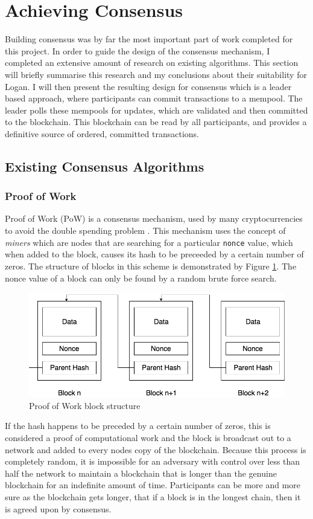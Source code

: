 \documentclass[12pt,a4paper,twoside,openright]{report}
\begin{document}
	\section{Achieving Consensus}\label{sec:consensus}
	Building consensus was by far the most important part of work completed for this project. 
	In order to guide the design of the consensus mechanism, I completed an extensive amount of research on existing algorithms.
	This section will briefly summarise this research and my conclusions about their suitability for Logan.
	I will then present the resulting design for consensus which is a leader based approach, where participants can commit transactions to a mempool.
	The leader polls these mempools for updates, which are validated and then committed to the blockchain.
	This blockchain can be read by all participants, and provides a definitive source of ordered, committed transactions.

	\subsection{Existing Consensus Algorithms} 
	\subsubsection*{Proof of Work} 
	Proof of Work (PoW) is a consensus mechanism, used by many cryptocurrencies to avoid the double spending problem \parencite{Bitcoin}. 
	This mechanism uses the concept of \textit{miners} which are nodes that are searching for a particular \texttt{nonce} value, which when added to the block, causes its hash to be preceeded by a certain number of zeros.
	The structure of blocks in this scheme is demonstrated by Figure \ref{figs:pow}. 
	The nonce value of a block can only be found by a random brute force search.
	\begin{figure}
		\centering
		\includegraphics[width=13cm]{figs/PoW.png}
		\caption{Proof of Work block structure}
		\label{figs:pow}
	\end{figure}
	If the hash happens to be preceded by a certain number of zeros, this is considered a proof of computational work and the block is broadcast out to a network and added to every nodes copy of the blockchain.
	Because this process is completely random, it is impossible for an adversary with control over less than half the network to maintain a blockchain that is longer than the genuine blockchain for an indefinite amount of time.
	Participants can be more and more sure as the blockchain gets longer, that if a block is in the longest chain, then it is agreed upon by consensus. \\
\end{document}
